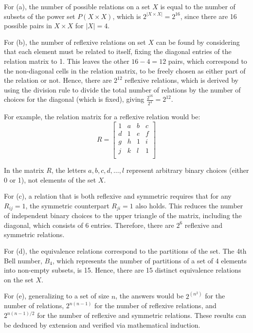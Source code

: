     \begin{solution}
        For (a), the number of possible relations on a set $X$ is equal to the number of subsets of the power set $P(X \times X)$, which is $2^{|X \times X|} = 2^{16}$, since there are 16 possible pairs in $X \times X$ for $|X| = 4$.
        
        For (b), the number of reflexive relations on set $X$ can be found by considering that each element must be related to itself, fixing the diagonal entries of the relation matrix to 1. This leaves the other $16 - 4 = 12$ pairs, which correspond to the non-diagonal cells in the relation matrix, to be freely chosen as either part of the relation or not. Hence, there are $2^{12}$ reflexive relations, which is derived by using the division rule to divide the total number of relations by the number of choices for the diagonal (which is fixed), giving $\frac{2^{16}}{2^4} = 2^{12}$.
        
        For example, the relation matrix for a reflexive relation would be:
        $$
        R = \begin{bmatrix}
        1 & a & b & c \\
        d & 1 & e & f \\
        g & h & 1 & i \\
        j & k & l & 1 \\
        \end{bmatrix}
        $$
        \begin{remark}
        In the matrix $R$, the letters $a, b, c, d, \ldots, l$ represent arbitrary binary choices (either 0 or 1), not elements of the set $X$.
        \end{remark}
        
        For (c), a relation that is both reflexive and symmetric requires that for any $R_{ij} = 1$, the symmetric counterpart $R_{ji} = 1$ also holds. This reduces the number of independent binary choices to the upper triangle of the matrix, including the diagonal, which consists of 6 entries. Therefore, there are $2^6$ reflexive and symmetric relations.
        
        For (d), the equivalence relations correspond to the partitions of the set. The 4th Bell number, $B_4$, which represents the number of partitions of a set of 4 elements into non-empty subsets, is 15. Hence, there are 15 distinct equivalence relations on the set $X$.
        
        For (e), generalizing to a set of size $n$, the answers would be $2^{(n^2)}$ for the number of relations, $2^{n(n-1)}$ for the number of reflexive relations, and $2^{n(n-1)/2}$ for the number of reflexive and symmetric relations. These results can be deduced by extension and verified via mathematical induction.
        \end{solution}






















